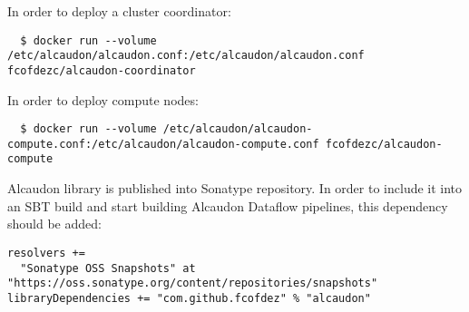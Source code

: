 In order to deploy a cluster coordinator:

\begin{lstlisting}
  $ docker run --volume /etc/alcaudon/alcaudon.conf:/etc/alcaudon/alcaudon.conf fcofdezc/alcaudon-coordinator
\end{lstlisting}

In order to deploy compute nodes:

\begin{lstlisting}
  $ docker run --volume /etc/alcaudon/alcaudon-compute.conf:/etc/alcaudon/alcaudon-compute.conf fcofdezc/alcaudon-compute
\end{lstlisting}

Alcaudon library is published into Sonatype repository. In order to include it into
an SBT build and start building Alcaudon Dataflow pipelines, this dependency should be added:

\begin{lstlisting}
resolvers += 
  "Sonatype OSS Snapshots" at "https://oss.sonatype.org/content/repositories/snapshots"
libraryDependencies += "com.github.fcofdez" % "alcaudon"
\end{lstlisting}
